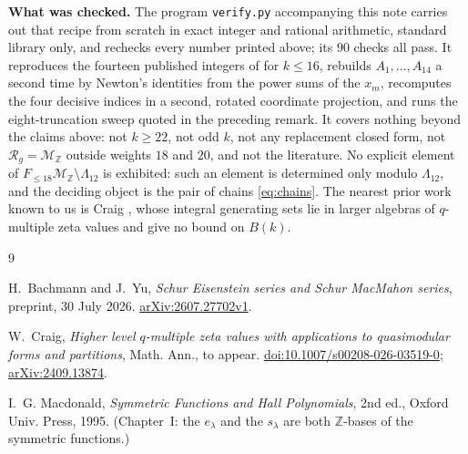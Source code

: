 \documentclass[11pt]{amsart}
\theoremstyle{remark}
\newcommand{\MZ}{\mathcal M_{\mathbb Z}}
\newcommand{\Rg}{\mathcal R_g}
\newcommand{\Lam}{\Lambda}
\begin{document}
\medskip
\noindent\textbf{What was checked.}
The program \texttt{verify.py} accompanying this note carries out that recipe from scratch in
exact integer and rational arithmetic, standard library only, and rechecks every number printed
above; its $90$ checks all pass. It reproduces the fourteen published integers of \cite{BY} for
$k\le16$, rebuilds $A_1,\dots,A_{14}$ a second time by Newton's identities from the power sums of
the $x_m$, recomputes the four decisive indices in a second, rotated coordinate projection, and
runs the eight-truncation sweep quoted in the preceding remark. It covers nothing beyond the claims
above: not $k\ge22$, not odd $k$, not any replacement closed form, not $\Rg=\MZ$ outside weights
$18$ and $20$, and not the literature. No explicit element of $F_{\le18}\MZ\setminus\Lam_{12}$ is
exhibited: such an element is determined only modulo $\Lam_{12}$, and the deciding object is the
pair of chains \eqref{eq:chains}. The nearest prior work known to us is Craig \cite{Craig}, whose
integral generating sets lie in larger algebras of $q$-multiple zeta values and give no bound on
$B(k)$.

\begin{thebibliography}{9}

H.~Bachmann and J.~Yu,
\emph{Schur Eisenstein series and Schur MacMahon series},
preprint, 30 July 2026. \href{https://arxiv.org/abs/2607.27702}{arXiv:2607.27702v1}.

W.~Craig,
\emph{Higher level $q$-multiple zeta values with applications to quasimodular forms and
partitions},
Math. Ann., to appear.
\href{https://doi.org/10.1007/s00208-026-03519-0}{doi:10.1007/s00208-026-03519-0};
\href{https://arxiv.org/abs/2409.13874}{arXiv:2409.13874}.

I.~G. Macdonald,
\emph{Symmetric Functions and Hall Polynomials},
2nd ed., Oxford Univ. Press, 1995. (Chapter~I: the $e_\lambda$ and the $s_\lambda$ are both
$\mathbb Z$-bases of the symmetric functions.)

\end{thebibliography}
\end{document}
